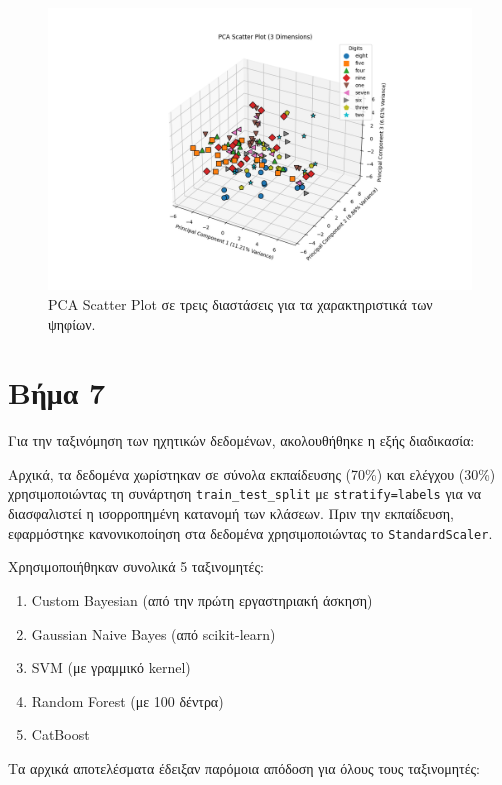 \documentclass[a4paper,12pt]{article}
\begin{document}
\begin{figure}[h]
    \centering
    \includegraphics[width=\textwidth]{images/pca_3d_plot.png}
    \caption{PCA Scatter Plot σε τρεις διαστάσεις για τα χαρακτηριστικά των ψηφίων.}
    \label{fig:pca_3d_plot}
\end{figure}

\section*{Βήμα 7}

Για την ταξινόμηση των ηχητικών δεδομένων, ακολουθήθηκε η εξής διαδικασία:

Αρχικά, τα δεδομένα χωρίστηκαν σε σύνολα εκπαίδευσης (70\%) και ελέγχου (30\%)
χρησιμοποιώντας τη συνάρτηση \texttt{train\_test\_split} με \texttt{stratify=labels}
για να διασφαλιστεί η ισορροπημένη κατανομή των κλάσεων. Πριν την εκπαίδευση,
εφαρμόστηκε κανονικοποίηση στα δεδομένα χρησιμοποιώντας το \texttt{StandardScaler}.

Χρησιμοποιήθηκαν συνολικά 5 ταξινομητές:
\begin{enumerate}
    \item Custom Bayesian (από την πρώτη εργαστηριακή άσκηση)
    \item Gaussian Naive Bayes (από scikit-learn)
    \item SVM (με γραμμικό kernel)
    \item Random Forest (με 100 δέντρα)
    \item CatBoost
\end{enumerate}

Τα αρχικά αποτελέσματα έδειξαν παρόμοια απόδοση για όλους τους ταξινομητές:
\end{document}
